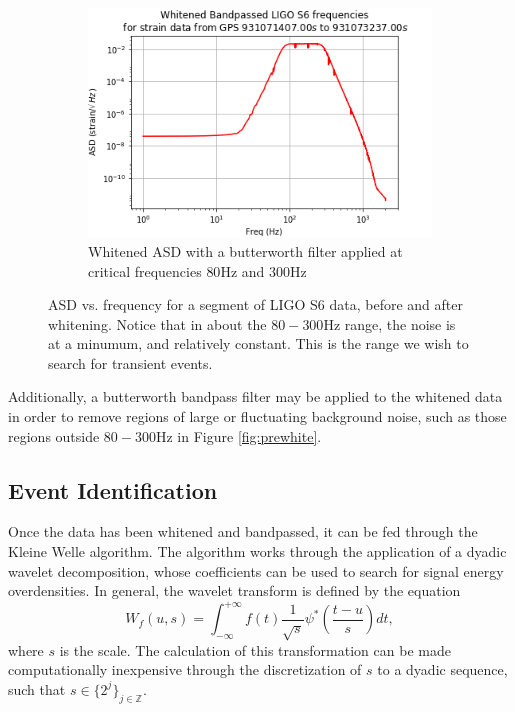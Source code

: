 \documentclass{article}
\begin{document}
\begin{figure}
\begin{subfigure}[t]{0.5\textwidth}
\includegraphics[width=\textwidth]{whitebp.png}
\caption{Whitened ASD with a butterworth filter applied at critical frequencies $80\mathrm{Hz}$ and $300\mathrm{Hz}$}
\label{fig:postwhitebp}
\end{subfigure}

\caption{ASD vs. frequency for a segment of LIGO S6 data, before and after whitening. Notice that in about the $80-300\mathrm{Hz}$ range, the noise is at a minumum, and relatively constant. This is the range we wish to search for transient events.}
\label{fig:asd}
\end{figure}

Additionally, a butterworth bandpass filter may be applied to the whitened data\citep{Blackburn2007}\citep{LIGOScientificCollaboration} in order to remove regions of large or fluctuating background noise, such as those regions outside $80-300\mathrm{Hz}$ in Figure \ref{fig:prewhite}.

\subsection{Event Identification}
Once the data has been whitened and bandpassed, it can be fed through the Kleine Welle algorithm. The algorithm works through the application of a dyadic wavelet decomposition, whose coefficients can be used to search for signal energy overdensities\citep{Biswas2013}\citep{Blackburn2007}. In general, the wavelet transform is defined by the equation\citep{Blackburn2007}\citep{Mallat1999}
\begin{equation}
W_{f}(u,s)=\int_{-\infty}^{+\infty}f(t)\frac{1}{\sqrt{s}}\psi^{*}\left(\frac{t-u}{s}\right)dt, \label{eq:wavtr}
\end{equation}
where $s$ is the scale. The calculation of this transformation can be made computationally inexpensive through the discretization of $s$ to a dyadic sequence, such that $s \in \{2^{j}\}_{j\in\mathbb{Z}}$\citep{Blackburn2007}\citep{Mallat1999}.
\end{document}
